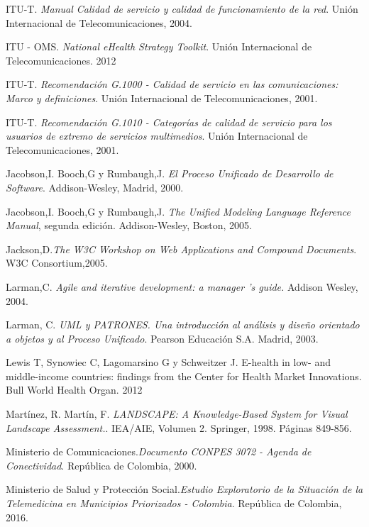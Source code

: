 \begin{thebibliography}{}
 ITU-T. \textit{Manual Calidad de servicio y calidad de funcionamiento de la red}. Unión Internacional de Telecomunicaciones, 2004.

 ITU - OMS. \textit{National eHealth Strategy Toolkit}. Unión Internacional de Telecomunicaciones. 2012 

 ITU-T. \textit{Recomendación G.1000 - Calidad de servicio en las comunicaciones: Marco y definiciones}. Unión Internacional de Telecomunicaciones, 2001.

 ITU-T. \textit{Recomendación G.1010 - Categorías de calidad de servicio para los usuarios de extremo de servicios multimedios}. Unión Internacional de Telecomunicaciones, 2001.

 Jacobson,I. Booch,G y Rumbaugh,J. \textit{El Proceso Unificado de Desarrollo de Software}. Addison-Wesley, Madrid, 2000.

 Jacobson,I. Booch,G y Rumbaugh,J. \textit{The Unified Modeling Language Reference Manual}, segunda edición. Addison-Wesley, Boston, 2005.

 Jackson,D.\textit{The W3C Workshop on Web Applications and Compound Documents}. W3C Consortium,2005.

 Larman,C. \textit{Agile and iterative development: a manager ’s guide.} Addison Wesley, 2004.

 Larman, C. \textit{UML y PATRONES. Una introducción al análisis y diseño orientado a objetos y al Proceso Unificado}. Pearson Educación S.A. Madrid, 2003.

 Lewis T, Synowiec C, Lagomarsino G y Schweitzer J. E-health in low- and middle-income countries: findings from the Center for Health Market Innovations. Bull World Health Organ. 2012

 Martínez, R. Martín, F. \textit{LANDSCAPE: A Knowledge-Based System for Visual Landscape Assessment.}. IEA/AIE, Volumen 2. Springer, 1998. Páginas 849-856.

 Ministerio de Comunicaciones.\textit{Documento CONPES 3072 - Agenda de Conectividad}. República de Colombia, 2000.

 Ministerio de Salud y Protección Social.\textit{Estudio Exploratorio de la Situación de la Telemedicina en Municipios Priorizados - Colombia}. República de Colombia, 2016.


\end{thebibliography}
